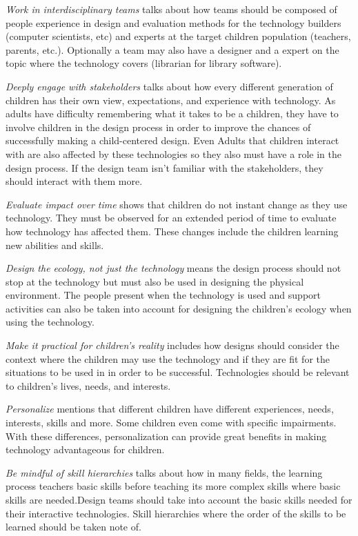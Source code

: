 \textit{Work in interdisciplinary teams} talks about how teams should be composed of people experience in design and evaluation methods for the technology builders (computer scientists, etc) and experts at the target children population (teachers, parents, etc.). Optionally a team may also have a designer and a expert on the topic where the technology covers (librarian for library software).

\textit{Deeply engage with stakeholders} talks about how every different generation of children has their own view, expectations, and experience with technology. As adults have difficulty remembering what it takes to be a children, they have to involve children in the design process in order to improve the chances of successfully making a child-centered design.  Even Adults that children interact with are also affected by these technologies so they also must have a role in the design process. If the design team isn't familiar with the stakeholders, they should interact with them more.

\textit{Evaluate impact over time} shows that children do not instant change as they use technology. They must be observed for an extended period of time to evaluate how technology has affected them. These changes include the children learning new abilities and skills.

\textit{Design the ecology, not just the technology} means the design process should not stop at the technology but must also be used in designing the physical environment. The people present when the technology is used and support activities can also be taken into account for designing the children's ecology when using the technology.

\textit{Make it practical for children’s reality} includes how designs should consider the context where the children may use the technology and if they are fit for the situations to be used in in order to be successful. Technologies should be relevant to children’s lives, needs, and interests.

\textit{Personalize} mentions that different children have different experiences, needs, interests, skills and more. Some children even come with specific impairments.  With these differences, personalization can provide great benefits in making technology advantageous for children.

\textit{Be mindful of skill hierarchies} talks about how in many fields, the learning process teachers basic skills before teaching its more complex skills where basic skills are needed.Design teams should take into account the basic skills needed for their interactive technologies. Skill hierarchies where the order of the skills to be learned should be taken note of.

